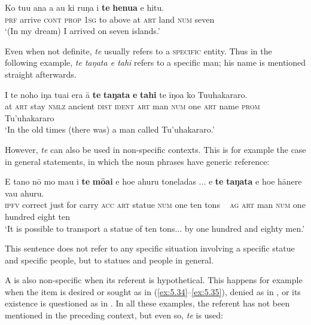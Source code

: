 \ea\label{ex:5.31}
\gll Ko tu{\ꞌ}u {\ꞌ}ana a au ki ruŋa i \textbf{te} \textbf{henua} e hitu. \\
\textsc{prf} arrive \textsc{cont} \textsc{prop} \textsc{1sg} to above at \textsc{art} land \textsc{num} seven \\

\glt
‘(In my dream) I arrived on seven islands.’ \textstyleExampleref{[R420.014]} 
\z

Even when not definite, \textit{te} usually refers to a \textsc{specific} entity. Thus in the following example, \textit{te taŋata e tahi} refers to a specific man; his name is mentioned straight afterwards.

\ea\label{ex:5.32}
\gll {\ꞌ}I te noho iŋa tuai era {\ꞌ}ā \textbf{te} \textbf{taŋata} \textbf{e} \textbf{tahi} te {\ꞌ}īŋoa  ko Tu{\ꞌ}uhakararo.\\
at \textsc{art} stay \textsc{nmlz} ancient \textsc{dist} \textsc{ident} \textsc{art} man \textsc{num} one \textsc{art} name  \textsc{prom} Tu’uhakararo\\

\glt
‘In the old times (there was) a man called Tu’uhakararo.’ \textstyleExampleref{[R477.002]} 
\z

However, \textit{te} can also be used in non-specific contexts. This is for example the case in general statements, in which the noun phrases have generic reference:

\ea\label{ex:5.33}
\gll E tano nō mo ma{\ꞌ}u i \textbf{te} \textbf{mōai} e ho{\ꞌ}e {\ꞌ}ahuru toneladas ...  e \textbf{te} \textbf{taŋata} e ho{\ꞌ}e hānere va{\ꞌ}u {\ꞌ}ahuru.\\
\textsc{ipfv} correct just for carry \textsc{acc} \textsc{art} statue \textsc{num} one ten tons ~   \textsc{ag} \textsc{art} man \textsc{num} one hundred eight ten\\

\glt
‘It is possible to transport a statue of ten tons... by one hundred and eighty men.’ \textstyleExampleref{[R376.062]} 
\z

This sentence does not refer to any specific situation involving a specific statue and specific people, but to statues and people in general. 

A  is also non-specific when its referent is hypothetical. This happens for example when the item is desired or sought as in (\ref{ex:5.34}–\ref{ex:5.35}), denied as in , or its existence is questioned as in . In all these examples, the referent has not been mentioned in the preceding context, but even so, \textit{te} is used:

